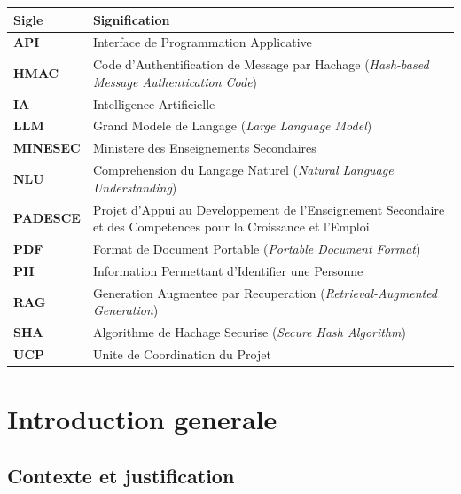 \documentclass[12pt,a4paper,twoside,openany]{report}
\begin{document}
\begin{center}
\begin{tabular}{>{\bfseries}l p{11cm}}
\toprule
\textbf{Sigle} & \textbf{Signification} \\
\midrule
API & Interface de Programmation Applicative \\
HMAC & Code d'Authentification de Message par Hachage (\textit{Hash-based Message Authentication Code}) \\
IA & Intelligence Artificielle \\
LLM & Grand Modele de Langage (\textit{Large Language Model}) \\
MINESEC & Ministere des Enseignements Secondaires \\
NLU & Comprehension du Langage Naturel (\textit{Natural Language Understanding}) \\
PADESCE & Projet d'Appui au Developpement de l'Enseignement Secondaire et des Competences pour la Croissance et l'Emploi \\
PDF & Format de Document Portable (\textit{Portable Document Format}) \\
PII & Information Permettant d'Identifier une Personne \\
RAG & Generation Augmentee par Recuperation (\textit{Retrieval-Augmented Generation}) \\
SHA & Algorithme de Hachage Securise (\textit{Secure Hash Algorithm}) \\
UCP & Unite de Coordination du Projet \\
\bottomrule
\end{tabular}
\end{center}

\newpage


\tableofcontents

\newpage


\setcounter{page}{1}

\chapter*{Introduction generale}

\section*{Contexte et justification}
\end{document}
